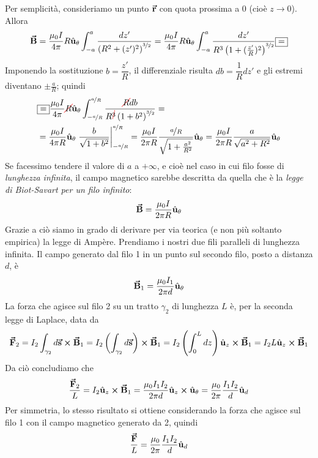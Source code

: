 Per semplicità, consideriamo un punto $\vb*{\va{r}}$ con quota prossima a $0$ (cioè $z\to 0$). Allora
\begin{equation*}
	\vba{B}=\frac{\mu_0 I}{4\pi}R\vbh{u}_{\theta}\int_{-a}^{a}\frac{dz'}{\left(R^2+(z')^2\right)^{\nicefrac{3}{2}}}=\frac{\mu_0 I}{4\pi}R\vbh{u}_{\theta}\int_{-a}^{a}\frac{dz'}{R^3\left(1+(\frac{z'}{R})^2\right)^{\nicefrac{3}{2}}}\squarequal
\end{equation*}
Imponendo la sostituzione $b=\dfrac{z'}{R}$, il differenziale risulta $db=\dfrac{1}{R}dz'$ e gli estremi diventano $\pm\frac{a}{R}$; quindi
\begin{align*}
	&\squarequal\frac{\mu_0 I}{4\pi}\Ccancel[red]{R}\vbh{u}_{\theta}\int_{-\nicefrac{a}{R}}^{\nicefrac{a}{R}}\frac{\Ccancel[red]{R}db}{R^{\Ccancel[red]{3}}\left(1+b^2\right)^{\nicefrac{3}{2}}}=\\
	&=\frac{\mu_0 I}{4\pi R}\vbh{u}_{\theta}\eval{\frac{b}{\sqrt{1+b^2}}}_{-\nicefrac{a}{R}}^{\nicefrac{a}{R}}=\frac{\mu_0 I}{2\pi R}\frac{\nicefrac{a}{R}}{\sqrt{1+\frac{a^2}{R^2}}}\vbh{u}_{\theta}=\frac{\mu_0 I}{2\pi R}\frac{a}{\sqrt{a^2+R^2}}\vbh{u}_{\theta}
\end{align*}
Se facessimo tendere il valore di $a$ a $+\infty$, e cioè nel caso in cui filo fosse di \textit{lunghezza infinita}, il campo magnetico sarebbe descritta da quella che è la \textit{legge di Biot-Savart per un filo infinito}:
\begin{equation}
	\vb*{\va{B}}=\frac{\mu_0 I}{2\pi R}\hat{\mathbf{u}}_{\theta}
\end{equation}
Grazie a ciò siamo in grado di derivare per via teorica (e non più soltanto empirica) la legge di Ampère. Prendiamo i nostri due fili paralleli di lunghezza infinita. Il campo generato dal filo 1 in un punto sul secondo filo, posto a distanza $d$, è
\begin{equation*}
	\vb*{\va{B}}_1=\frac{\mu_0 I_1}{2\pi d}\hat{\mathbf{u}}_\theta
\end{equation*}
La forza che agisce sul filo 2 su un tratto $\gamma_2$ di lunghezza $L$ è, per la seconda legge di Laplace, data da
\begin{equation*}
	\vb*{\va{F}}_2=I_2\int_{\gamma_2}d\vb*{\va{s}}\cross\vb*{\va{B}}_1=I_2\left(\int_{\gamma_2}d\vb*{\va{s}}\right)\cross\vb*{\va{B}}_1=I_2\left(\int_{0}^Ldz\right)\hat{\mathbf{u}}_z\cross\vb*{\va{B}}_1=I_2L\hat{\mathbf{u}}_z\cross\vb*{\va{B}}_1
\end{equation*}
Da ciò concludiamo che 
\begin{equation*}
	\frac{\vb*{\va{F}}_2}{L}=I_2\hat{\mathbf{u}}_z\cross\vb*{\va{B}}_1=\frac{\mu_0 I_1 I_2}{2\pi d}\hat{\mathbf{u}}_z\cross\hat{\mathbf{u}}_{\theta}=\frac{\mu_0}{2\pi}\frac{I_1I_2}{d}\hat{\mathbf{u}}_d
\end{equation*}
Per simmetria, lo stesso risultato si ottiene considerando la forza che agisce sul filo 1 con il campo magnetico generato da 2, quindi
\begin{equation}
	\frac{\vb*{\va{F}}}{L}=\frac{\mu_0}{2\pi}\frac{I_1I_2}{d}\hat{\mathbf{u}}_d
\end{equation}
